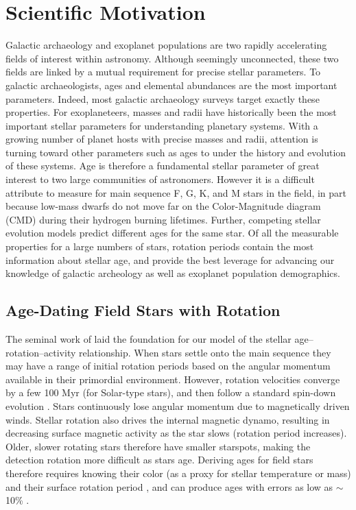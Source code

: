 \documentclass[12pt]{article}
\begin{document}
\section{Scientific Motivation}
Galactic archaeology and exoplanet populations are two rapidly accelerating
fields of interest within astronomy.
Although seemingly unconnected, these two fields are linked by a mutual
requirement for precise stellar parameters.
To galactic archaeologists, ages and elemental abundances are the most
important parameters.
Indeed, most galactic archaeology surveys target exactly these properties.
For exoplaneteers, masses and radii have historically been the most important
stellar parameters for understanding planetary systems. With a
growing number of planet hosts with precise masses and radii, attention is turning
toward other parameters such as ages to under the history and evolution of these systems.
Age is therefore a fundamental stellar parameter of great interest to two large
communities of astronomers. However it is a difficult attribute to measure for
main sequence F, G, K, and M stars in the field, in part because low-mass dwarfs do not move far on the Color-Magnitude
diagram (CMD) during their hydrogen burning lifetimes. Further,
competing stellar evolution models predict different ages for the same star.
Of all the measurable properties for a large numbers of stars, rotation periods contain
the most information about stellar age, and provide the best leverage for advancing our knowledge of galactic archeology as well as exoplanet population demographics.




\subsection{Age-Dating Field Stars with Rotation}
The seminal work of \citet{skumanich1972} laid the foundation for our model of the stellar age--rotation--activity relationship. When stars settle onto the main sequence they may have a range of initial rotation periods based on the angular momentum available in their primordial environment. However, rotation velocities converge by a few 100 Myr (for Solar-type stars), and then follow a standard spin-down evolution \citep{barnes2010}. Stars continuously lose angular momentum due to magnetically driven winds. Stellar rotation also drives the internal magnetic dynamo, resulting in decreasing surface magnetic activity as the star slows (rotation period increases). Older, slower rotating stars therefore have smaller starspots, making the detection rotation more difficult as stars age. Deriving ages for field stars therefore requires knowing their color (as a proxy for stellar temperature or mass) and their surface rotation period \citep{barnes2007}, and can produce ages with errors as low as $\sim$10\% \citep{barnes2010}.
\end{document}

